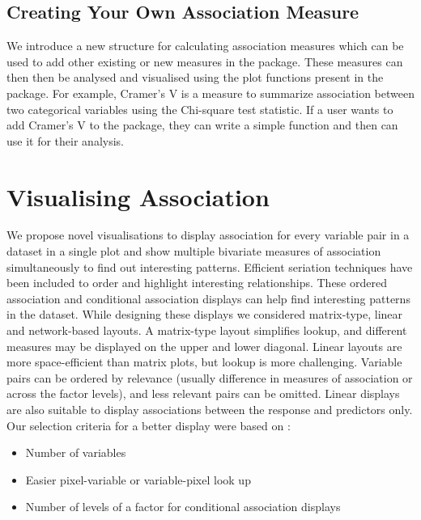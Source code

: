 \hypertarget{creating-your-own-association-measure}{%
\subsection{Creating Your Own Association
Measure}\label{creating-your-own-association-measure}}

We introduce a new structure for calculating association measures which
can be used to add other existing or new measures in the package. These
measures can then then be analysed and visualised using the plot
functions present in the package. For example, Cramer's V is a measure
to summarize association between two categorical variables using the
Chi-square test statistic. If a user wants to add Cramer's V to the
package, they can write a simple function and then can use it for their
analysis.

\hypertarget{visualising-association}{%
\section{Visualising Association}\label{visualising-association}}

We propose novel visualisations to display association for every
variable pair in a dataset in a single plot and show multiple bivariate
measures of association simultaneously to find out interesting patterns.
Efficient seriation techniques have been included to order and highlight
interesting relationships. These ordered association and conditional
association displays can help find interesting patterns in the dataset.
While designing these displays we considered matrix-type, linear and
network-based layouts. A matrix-type layout simplifies lookup, and
different measures may be displayed on the upper and lower diagonal.
Linear layouts are more space-efficient than matrix plots, but lookup is
more challenging. Variable pairs can be ordered by relevance (usually
difference in measures of association or across the factor levels), and
less relevant pairs can be omitted. Linear displays are also suitable to
display associations between the response and predictors only. Our
selection criteria for a better display were based on :

\begin{itemize}
\item Number of variables
\item Easier pixel-variable or variable-pixel
look up
\item Number of levels of a factor for conditional association displays
\end{itemize}

